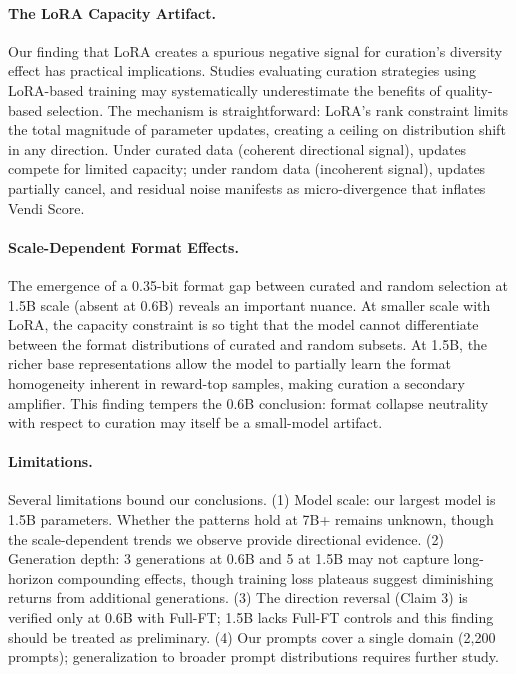 \documentclass[11pt,a4paper]{article}
\begin{document}
\paragraph{The LoRA Capacity Artifact.}
Our finding that LoRA creates a spurious negative signal for curation's diversity effect has practical implications. Studies evaluating curation strategies using LoRA-based training may systematically underestimate the benefits of quality-based selection. The mechanism is straightforward: LoRA's rank constraint limits the total magnitude of parameter updates, creating a ceiling on distribution shift in any direction. Under curated data (coherent directional signal), updates compete for limited capacity; under random data (incoherent signal), updates partially cancel, and residual noise manifests as micro-divergence that inflates Vendi Score.

\paragraph{Scale-Dependent Format Effects.}
The emergence of a 0.35-bit format gap between curated and random selection at 1.5B scale (absent at 0.6B) reveals an important nuance. At smaller scale with LoRA, the capacity constraint is so tight that the model cannot differentiate between the format distributions of curated and random subsets. At 1.5B, the richer base representations allow the model to partially learn the format homogeneity inherent in reward-top samples, making curation a secondary amplifier. This finding tempers the 0.6B conclusion: format collapse neutrality with respect to curation may itself be a small-model artifact.

\paragraph{Limitations.}
Several limitations bound our conclusions. (1) Model scale: our largest model is 1.5B parameters. Whether the patterns hold at 7B+ remains unknown, though the scale-dependent trends we observe provide directional evidence. (2) Generation depth: 3 generations at 0.6B and 5 at 1.5B may not capture long-horizon compounding effects, though training loss plateaus suggest diminishing returns from additional generations. (3) The direction reversal (Claim 3) is verified only at 0.6B with Full-FT; 1.5B lacks Full-FT controls and this finding should be treated as preliminary. (4) Our prompts cover a single domain (2,200 prompts); generalization to broader prompt distributions requires further study.
\end{document}
